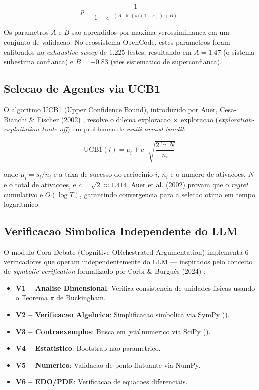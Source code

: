 \documentclass[5p]{elsarticle}
\begin{document}
\begin{equation}
p = \frac{1}{1 + e^{-(A \cdot \ln(s/(1-s)) + B)}}
\label{eq:platt}
\end{equation}

Os parametros $A$ e $B$ sao aprendidos por maxima verossimilhanca em um conjunto de
validacao. No ecossistema OpenCode, estes parametros foram calibrados no
\textit{exhaustive sweep} de 1.225 testes, resultando em $A = 1.47$ (o sistema
subestima confianca) e $B = -0.83$ (vies sistematico de superconfianca).

\subsection{Selecao de Agentes via UCB1}

O algoritmo UCB1 (Upper Confidence Bound), introduzido por Auer, Cesa-Bianchi \&
Fischer (2002) \cite{auer2002ucb1}, resolve o dilema exploracao $\times$ exploracao
(\textit{exploration-exploitation trade-off}) em problemas de \textit{multi-armed
bandit}:

\begin{equation}
\text{UCB1}(i) = \bar{\mu}_i + c \cdot \sqrt{\frac{2 \ln N}{n_i}}
\label{eq:ucb1}
\end{equation}

onde $\bar{\mu}_i = s_i / n_i$ e a taxa de sucesso do raciocinio $i$, $n_i$ e o
numero de ativacoes, $N$ e o total de ativacoes, e $c = \sqrt{2} \approx 1.414$.
Auer et al. (2002) provam que o \textit{regret} cumulativo e $O(\log T)$,
garantindo convergencia para a selecao otima em tempo logaritmico.

\subsection{Verificacao Simbolica Independente do LLM}

O modulo Cora-Debate (Cognitive ORchestrated Argumentation) implementa 6
verificadores que operam independentemente do LLM --- inspirados pelo conceito de
\textit{symbolic verification} formalizado por Corbí \& Burgués (2024)
\cite{corbí2024}:

\begin{itemize}[leftmargin=*]
  \item \textbf{V1 -- Analise Dimensional}: Verifica consistencia de unidades
        fisicas usando o Teorema $\pi$ de Buckingham.
  \item \textbf{V2 -- Verificacao Algebrica}: Simplificacao simbolica via SymPy
        (\cite{meurer2017sympy}).
  \item \textbf{V3 -- Contraexemplos}: Busca em \textit{grid} numerico via SciPy
        (\cite{virtanen2020scipy}).
  \item \textbf{V4 -- Estatistico}: Bootstrap nao-parametrico.
  \item \textbf{V5 -- Numerico}: Validacao de ponto flutuante via NumPy.
  \item \textbf{V6 -- EDO/PDE}: Verificacao de equacoes diferenciais.
\end{itemize}
\end{document}
